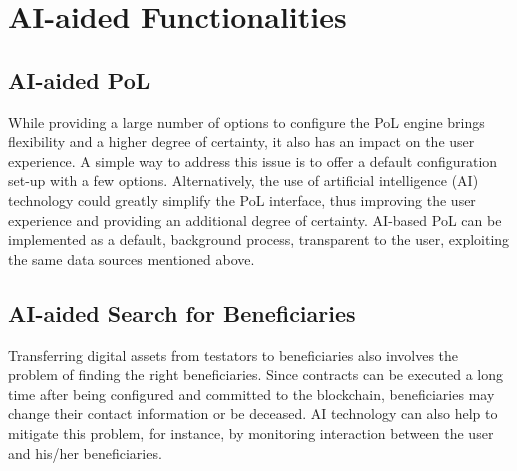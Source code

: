 \section{AI-aided Functionalities} %
\label{sec:ai_aided_functionalities}


\subsection*{AI-aided PoL} %
\label{sub:ai_based_pol}

While providing a large number of options to configure the PoL engine brings flexibility and a higher degree of certainty, it also has an impact on the user experience. A simple way to address this issue is to offer a default configuration set-up with a few options. Alternatively, the use of artificial intelligence (AI) technology could greatly simplify the PoL interface, thus improving the user experience and providing an additional degree of certainty. AI-based PoL can be implemented as a default, background process, transparent to the user, exploiting the same data sources mentioned above.


\subsection*{AI-aided Search for Beneficiaries} %
\label{sub:ai_aided_search_for_beneficiaries}
Transferring digital assets from testators to beneficiaries also involves the problem of finding the right beneficiaries. Since contracts can be executed a long time after being configured and committed to the blockchain, beneficiaries may change their contact information or be deceased. 
AI technology can also help to mitigate this problem, for instance, by monitoring interaction between the user and his/her beneficiaries.



